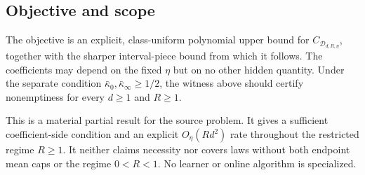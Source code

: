 \subsection{Objective and scope}

The objective is an explicit, class-uniform polynomial upper bound for
$C_{\mathcal D_{d,R,\eta}}$, together with the sharper interval-piece bound
from which it follows.  The coefficients may depend on the fixed $\eta$ but
on no other hidden quantity.  Under the separate condition
$\bar\kappa_0,\bar\kappa_\infty\geq1/2$, the witness above should certify
nonemptiness for every $d\geq1$ and $R\geq1$.

This is a material partial result for the source problem.  It gives a
sufficient coefficient-side condition and an explicit $O_\eta(Rd^2)$ rate
throughout the restricted regime $R\geq1$.  It neither claims necessity nor
covers laws without both endpoint mean caps or the regime $0<R<1$.
No learner or online algorithm is specialized.
